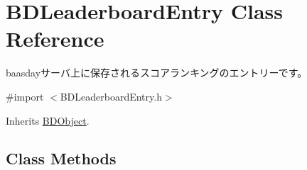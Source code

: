 \hypertarget{interface_b_d_leaderboard_entry}{\section{B\-D\-Leaderboard\-Entry Class Reference}
\label{interface_b_d_leaderboard_entry}
}


baasdayサーバ上に保存されるスコアランキングのエントリーです。  




{\ttfamily \#import $<$B\-D\-Leaderboard\-Entry.\-h$>$}



Inherits \hyperlink{interface_b_d_object}{B\-D\-Object}.

\subsection*{Class Methods}

